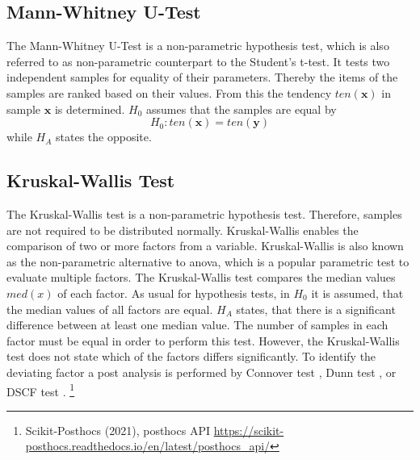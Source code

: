 \subsection{Mann-Whitney U-Test}\label{ord:ch2:sec4:subsec3}

The Mann-Whitney U-Test \cite{MW47-MannWhitneyTest} is a non-parametric hypothesis test, which is also referred to as non-parametric counterpart to the Student's t-test.
It tests two independent samples for equality of their parameters.
Thereby the items of the samples are ranked based on their values.
From this the tendency $ten \left( \textbf{x} \right) $ in sample $ \textbf{x} $ is determined.
$H_{0}$ assumes that the samples are equal by
\begin{equation}
	H_{0}: ten \left( \textbf{x} \right) = ten \left( \textbf{y} \right)
\end{equation}
 while $H_{A}$ states the opposite.


\subsection{Kruskal-Wallis Test}\label{ord:ch2:sec4:subsec4}
The Kruskal-Wallis test \cite{KW53-KruskalWallisTest} is a non-parametric hypothesis test.
Therefore, samples are not required to be distributed normally.
Kruskal-Wallis enables the comparison of two or more factors from a variable.
Kruskal-Wallis is also known as the non-parametric alternative to \gls{anova}, which is a popular parametric test to evaluate multiple factors.
The Kruskal-Wallis test compares the median values $med \left( x \right) $ of each factor.
As usual for hypothesis tests, in $H_{0}$ it is assumed, that the median values of all factors are equal.
$H_{A}$ states, that there is a significant difference between at least one median value.
The number of samples in each factor must be equal in order to perform this test.
However, the Kruskal-Wallis test does not state which of the factors differs significantly.
To identify the deviating factor a post analysis is performed by \eg Connover test \cite{CI79-ConnocerTest}, Dunn test \cite{Dunn64-DunnTest}, or DSCF test \cite{CF91-dscf}. \footnote{Scikit-Posthocs (2021), posthocs API \url{https://scikit-posthocs.readthedocs.io/en/latest/posthocs_api/}} 

